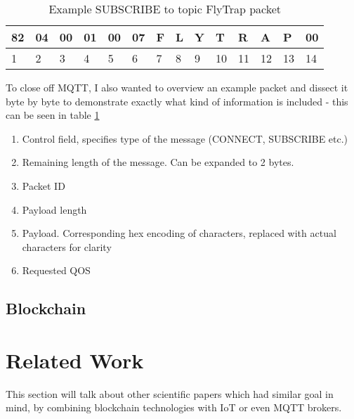 \begin{table}[]
\centering
\begin{tabular}{llllllllllllll}
\hline
\multicolumn{1}{|l|}{82} & \multicolumn{1}{l|}{04} & \multicolumn{1}{l|}{00} & \multicolumn{1}{l|}{01} & \multicolumn{1}{l|}{00} & \multicolumn{1}{l|}{07} & \multicolumn{1}{l|}{F} & \multicolumn{1}{l|}{L} & \multicolumn{1}{l|}{Y} & \multicolumn{1}{l|}{T} & \multicolumn{1}{l|}{R} & \multicolumn{1}{l|}{A} & \multicolumn{1}{l|}{P} & \multicolumn{1}{l|}{00} \\ \hline
1                        & 2                       & 3                       & 4                       & 5                       & 6                       & 7                      & 8                      & 9                      & 10                     & 11                     & 12                     & 13                     & 14                     
\end{tabular}
\caption{Example SUBSCRIBE to topic FlyTrap packet}
\label{tab:sub_packet}
\end{table}

To close off MQTT, I also wanted to overview an example packet and dissect it byte by byte to demonstrate exactly what kind of information is included - this can be seen in table \ref{tab:sub_packet}
\begin{enumerate}
  \item [1] Control field, specifies type of the message (CONNECT, SUBSCRIBE etc.)
  \item [2] Remaining length of the message. Can be expanded to 2 bytes.
  \item [3-4] Packet ID
  \item [5-6] Payload length
  \item [7-13] Payload. Corresponding hex encoding of characters, replaced with actual characters for clarity
  \item [14] Requested QOS
\end{enumerate}

\subsection{Blockchain}



\section{Related Work}
This section will talk about other scientific papers which had similar goal in mind, by combining  blockchain technologies with IoT or even MQTT brokers.

